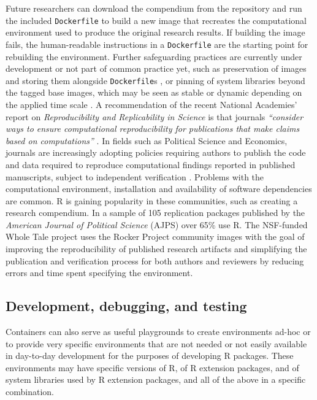 Future researchers can download the compendium from the repository and
run the included \texttt{Dockerfile} to build a new image that recreates
the computational environment used to produce the original research
results. If building the image fails, the human-readable instructions in
a \texttt{Dockerfile} are the starting point for rebuilding the
environment. Further safeguarding practices are currently under
development or not part of common practice yet, such as preservation of
images \citep{emsley_framework_2018} and storing them alongside
\texttt{Dockerfile}s \citep[cf.][]{nust_opening_2017}, or pinning of
system libraries beyond the tagged base images, which may be seen as
stable or dynamic depending on the applied time scale
\citep[see discussion on `debian:testing` base image in][]{RJ-2017-065}.
A recommendation of the recent National Academies' report on
\emph{Reproducibility and Replicability in Science} is that journals
\emph{``consider ways to ensure computational reproducibility for
publications that make claims based on computations''}
\citep{NASEM2019}. In fields such as Political Science and Economics,
journals are increasingly adopting policies requiring authors to publish
the code and data required to reproduce computational findings reported
in published manuscripts, subject to independent verification
\citep{Jacoby2017,Vilhuber2019,Alvarez2018,Christian2018,Eubank2016,King1995}.
Problems with the computational environment, installation and
availability of software dependencies are common. R is gaining
popularity in these communities, such as creating a research compendium.
In a sample of 105 replication packages published by the \emph{American
Journal of Political Science} (AJPS) over 65\% use R. The NSF-funded
Whole Tale project uses the Rocker Project community images with the
goal of improving the reproducibility of published research artifacts
and simplifying the publication and verification process for both
authors and reviewers by reducing errors and time spent specifying the
environment.

\hypertarget{development-debugging-and-testing}{%
\subsection{Development, debugging, and
testing}\label{development-debugging-and-testing}}

\label{development}

Containers can also serve as useful playgrounds to create environments
ad-hoc or to provide very specific environments that are not needed or
not easily available in day-to-day development for the purposes of
developing R packages. These environments may have specific versions of
R, of R extension packages, and of system libraries used by R extension
packages, and all of the above in a specific combination.


